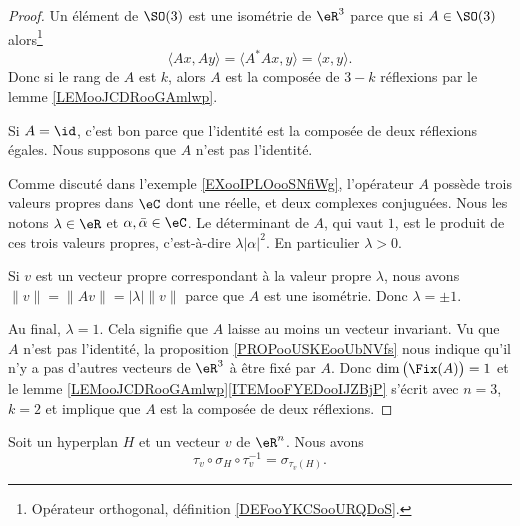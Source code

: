 \begin{proof}
	Un élément de \( \SO(3)\) est une isométrie de \( \eR^3\) parce que si \( A\in\SO(3)\) alors\footnote{Opérateur orthogonal, définition \ref{DEFooYKCSooURQDoS}.}
	\begin{equation}
		\langle Ax, Ay\rangle =\langle A^*Ax, y\rangle =\langle x, y\rangle .
	\end{equation}
	Donc si le rang de \( A\) est \( k\), alors \( A\) est la composée de \( 3-k\) réflexions par le lemme \ref{LEMooJCDRooGAmlwp}.

	Si \( A=\id\), c'est bon parce que l'identité est la composée de deux réflexions égales. Nous supposons que \( A\) n'est pas l'identité.

	Comme discuté dans l'exemple \ref{EXooIPLOooSNfiWg}, l'opérateur \( A\) possède trois valeurs propres dans \( \eC\) dont une réelle, et deux complexes conjuguées. Nous les notons \( \lambda\in \eR\) et \( \alpha,\bar \alpha\in \eC\). Le déterminant de \( A\), qui vaut \( 1\), est le produit de ces trois valeurs propres, c'est-à-dire \( \lambda| \alpha |^2\). En particulier \( \lambda>0\).

	Si \( v\) est un vecteur propre correspondant à la valeur propre \( \lambda\), nous avons \(  \| v \|= \| Av \|=| \lambda |\| v \|\) parce que \( A\) est une isométrie. Donc \( \lambda=\pm 1\).

	Au final, \( \lambda=1\). Cela signifie que \( A\) laisse au moins un vecteur invariant. Vu que \( A\) n'est pas l'identité, la proposition \ref{PROPooUSKEooUbNVfs} nous indique qu'il n'y a pas d'autres vecteurs de \( \eR^3\) à être fixé par \( A\). Donc \( \dim\big( \Fix(A) \big)=1\) et le lemme \ref{LEMooJCDRooGAmlwp}\ref{ITEMooFYEDooIJZBjP} s'écrit avec \( n=3\), \( k=2\) et implique que \( A\) est la composée de deux réflexions.
\end{proof}

\begin{lemma}       \label{LEMooMCVKooKzmlAg}
	Soit un hyperplan \( H\) et un vecteur \( v\) de \( \eR^n\). Nous avons
	\begin{equation}
		\tau_v\circ \sigma_H\circ\tau_v^{-1}=\sigma_{\tau_v(H)}.
	\end{equation}
\end{lemma}

